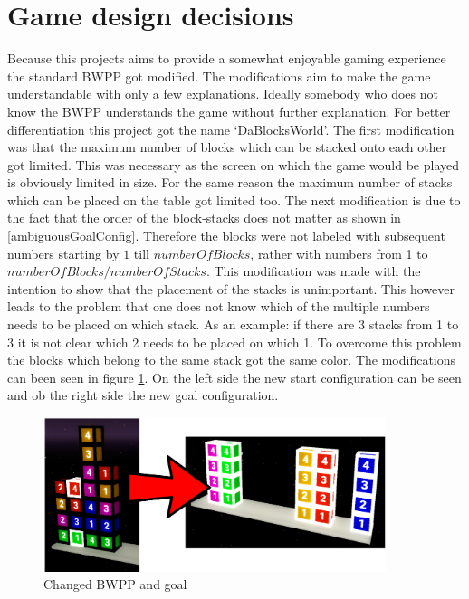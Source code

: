 \documentclass[runningheads]{llncs}
\begin{document}
    \section{Game design decisions}
        Because this projects aims to provide a somewhat enjoyable gaming experience the standard BWPP got modified.
        The modifications aim to make the game understandable with only a few explanations.
        Ideally somebody who does not know the BWPP understands the game without further explanation.
        For better differentiation this project got the name `DaBlocksWorld'.\newline
        The first modification was that the maximum number of blocks which can be stacked onto each other got limited.
        This was necessary as the screen on which the game would be played is obviously limited in size.
        For the same reason the maximum number of stacks which can be placed on the table got limited too.\newline
        The next modification is due to the fact that the order of the block-stacks does not matter as shown in \ref{ambiguousGoalConfig}.
        Therefore the blocks were not labeled with subsequent numbers starting by $1$ till $ numberOfBlocks$,
        rather with numbers from 1 to $ numberOfBlocks / numberOfStacks$.
        This modification was made with the intention to show that the placement of the stacks is unimportant.
        This however leads to the problem that one does not know which of the multiple numbers needs to be placed on which stack.
        As an example: if there are 3 stacks from 1 to 3 it is not clear which 2 needs to be placed on which 1.
        To overcome this problem the blocks which belong to the same stack got the same color.
        The modifications can been seen in figure \ref{colorizedGoal}.
        On the left side the new start configuration can be seen and ob the right side the new goal configuration.\newline
        
        \begin{figure}[h]
            \centering
            \includegraphics[width=10cm]{start_goal_config_colored.png}
            \caption{Changed BWPP and goal}
            \label{colorizedGoal}
        \end{figure}
        
\end{document}
